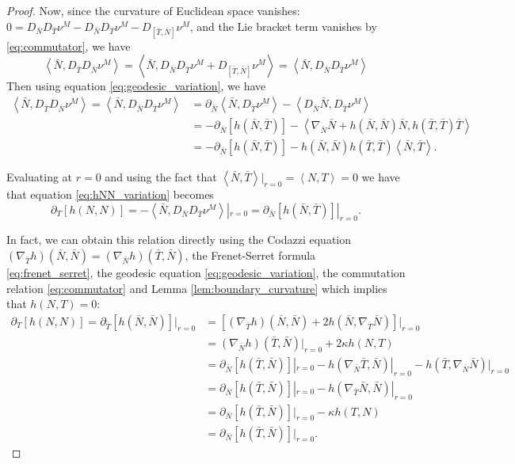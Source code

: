 \documentclass[10pt]{amsart}
\newcommand{\IP}[2]{\left< #1 , #2 \right>}
\theoremstyle{remark}
\begin{document}
\begin{proof}
Now, since the curvature of Euclidean space vanishes: \(0 = D_{\bar{N}} D_{\bar{T}} \nu^M - D_{\bar{N}} D_{\bar{T}} \nu^M - D_{[\bar{T}, \bar{N}]} \nu^M\), and the Lie bracket term vanishes by \eqref{eq:commutator}, we have
\[
\IP{\bar{N}}{D_{\bar{T}} D_{\bar{N}} \nu^M} = \IP{\bar{N}}{D_{\bar{N}} D_{\bar{T}} \nu^M + D_{[\bar{T}, \bar{N}]} \nu^M} = \IP{\bar{N}}{D_{\bar{N}} D_{\bar{T}} \nu^M}
\]
Then using equation \eqref{eq:geodesic_variation}, we have
\[
\begin{split}
\IP{\bar{N}}{D_{\bar{T}} D_{\bar{N}} \nu^M} = \IP{\bar{N}}{D_{\bar{N}} D_{\bar{T}} \nu^M} &= \partial_{\bar{N}} \IP{\bar{N}}{D_{\bar{T}} \nu^M} - \IP{D_{\bar{N}} \bar{N}}{D_{\bar{T}} \nu^M} \\
&= -\partial_{\bar{N}} [h(\bar{N}, \bar{T})] - \IP{\nabla_{\bar{N}} \bar{N} + h(\bar{N}, \bar{N}) \bar{N}}{h(\bar{T}, \bar{T}) \bar{T}} \\
&= -\partial_{\bar{N}} [h(\bar{N}, \bar{T})] - h(\bar{N}, \bar{N}) h(\bar{T}, \bar{T}) \IP{\bar{N}}{\bar{T}}.
\end{split}
\]

Evaluating at \(r = 0\) and using the fact that \(\IP{\bar{N}}{\bar{T}}|_{r=0} = \IP{N}{T} = 0\) we have that equation \eqref{eq:hNN_variation} becomes
\begin{equation}
\label{eq:hNN_variation_2}
\partial_T [h(N, N)] = - \IP{\bar{N}}{D_{\bar{N}} D_{\bar{T}} \nu^M}|_{r=0} = \partial_{\bar{N}} [h(\bar{N}, \bar{T})]|_{r=0}.
\end{equation}

In fact, we can obtain this relation directly using the Codazzi equation \((\nabla_{\bar{T}} h) (\bar{N}, \bar{N}) = (\nabla_{\bar{N}} h) (\bar{T}, \bar{N})\), the Frenet-Serret formula \eqref{eq:frenet_serret}, the geodesic equation \eqref{eq:geodesic_variation}, the commutation relation \eqref{eq:commutator} and Lemma \ref{lem:boundary_curvature} which implies that \(h(N, T) = 0\):
\[
\begin{split}
\partial_T [h(N, N)] = \partial_{\bar{T}} [h(\bar{N}, \bar{N})]|_{r=0} &= \left[(\nabla_{\bar{T}} h) (\bar{N}, \bar{N}) + 2h(\bar{N}, \nabla_{\bar{T}} \bar{N})\right]|_{r=0} \\
&= (\nabla_{\bar{N}} h) (\bar{T}, \bar{N})|_{r=0} + 2 \kappa h(N, T) \\
&= \partial_{\bar{N}} [h(\bar{T}, \bar{N})]|_{r=0} - h(\nabla_{\bar{N}} \bar{T}, \bar{N})|_{r=0} - h(\bar{T}, \nabla_{\bar{N}} \bar{N})|_{r=0} \\
&= \partial_{\bar{N}} [h(\bar{T}, \bar{N})]|_{r=0} - h(\nabla_{\bar{T}} \bar{N}, \bar{N})|_{r=0} \\
&= \partial_{\bar{N}} [h(\bar{T}, \bar{N})]|_{r=0} - \kappa h(T, N) \\
&= \partial_{\bar{N}} [h(\bar{T}, \bar{N})]|_{r=0}.
\end{split}
\]
\end{proof}
\end{document}
